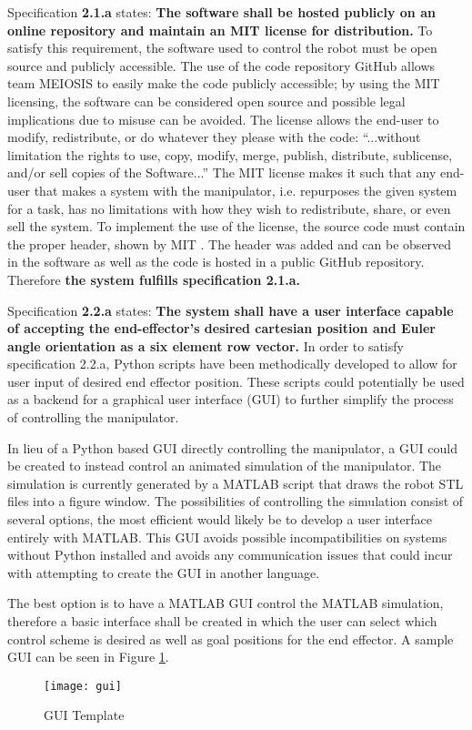 Specification \textbf{2.1.a} states: \textbf{The software shall be hosted publicly on an online repository and maintain an MIT license for distribution.} To satisfy this requirement, the software used to control the robot must be open source and publicly accessible. The use of the code repository GitHub allows team MEIOSIS to easily make the code publicly accessible; by using the MIT licensing, the software can be considered open source and possible legal implications due to misuse can be avoided. The license allows the end-user to modify, redistribute, or do whatever they please with the code: “...without limitation the rights to use, copy, modify, merge, publish, distribute, sublicense, and/or sell copies of the Software...”\cite{mit} The MIT license makes it such that any end-user that makes a system with the manipulator, i.e. repurposes the given system for a task, has no limitations with how they wish to redistribute, share, or even sell the system. To implement the use of the license, the source code must contain the proper header, shown by MIT \cite{mit}. The header was added and can be observed in the software as well as the code is hosted in a public GitHub repository. Therefore \textbf{the system fulfills specification 2.1.a.}


Specification \textbf{2.2.a} states: \textbf{The system shall have a user interface capable of accepting the end-effector’s desired cartesian position and Euler angle orientation as a six element row vector.} In order to satisfy specification 2.2.a, Python scripts have been methodically developed to allow for user input of desired end effector position. These scripts could potentially be used as a backend for a graphical user interface (GUI) to further simplify the process of controlling the manipulator.

In lieu of a Python based GUI directly controlling the manipulator, a GUI could be created to instead control an animated simulation of the manipulator. The simulation is currently generated by a MATLAB script that draws the robot STL files into a figure window. The possibilities of controlling the simulation consist of several options, the most efficient would likely be to develop a user interface entirely with MATLAB. This GUI avoids possible incompatibilities on systems without Python installed and avoids any communication issues that could incur with attempting to create the GUI in another language.

The best option is to have a MATLAB GUI control the MATLAB simulation, therefore a basic interface shall be created in which the user can select which control scheme is desired as well as goal positions for the end effector. A sample GUI can be seen in Figure \ref{fig:gui}.
\newpage
\let\clearpage\relax
\begin{figure}[htp]
  \centering
  \texttt{[image: gui]}
  \caption{GUI Template}
  \label{fig:gui}
\end{figure}

